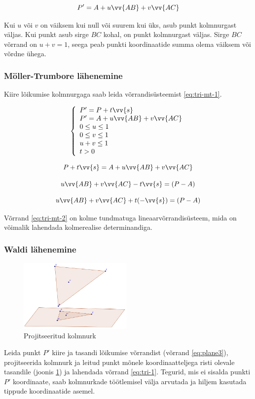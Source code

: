 \documentclass[a4paper,12pt]{report}
\renewcommand{\vec}[1]{\vv{#1}}
\begin{document}
\begin{equation} \label{eq:tri-1}
P' = A + u\vec{AB} + v\vec{AC}
\end{equation}

Kui \(u\) või \(v\) on väiksem kui null või suurem kui üks, asub punkt
kolmnurgast väljas. Kui punkt asub sirge \(BC\) kohal, on punkt
kolmnurgast väljas. Sirge \(BC\) võrrand on \(u + v = 1\), seega peab
punkti koordinaatide summa olema väiksem või võrdne ühega.

\subsubsection{Möller-Trumbore lähenemine}
Kiire lõikumise kolmnurgaga saab leida võrrandisüsteemist \ref{eq:tri-mt-1}.

\begin{equation} \label{eq:tri-mt-1}
\left\{
\begin{array}{l}
P' = P + t\vec s \\
P' = A + u\vec{AB} + v\vec{AC} \\
0 \leq u \leq 1 \\
0 \leq v \leq 1 \\
u + v \leq 1 \\
t > 0 
\end{array}
\right.
\end{equation}

\[P + t\vec s = A + u\vec{AB} + v\vec{AC}\]

\[u\vec{AB} + v\vec{AC} -t\vec s = (P - A)\]

\begin{equation} \label{eq:tri-mt-2}
u\vec{AB} + v\vec{AC} + t(-\vec s) = (P - A)
\end{equation}

Võrrand \ref{eq:tri-mt-2} on kolme tundmatuga lineaarvõrrandisüsteem,
mida on võimalik lahendada kolmerealise determinandiga. \cite{MT97}

\subsubsection{Waldi lähenemine}
\begin{figure}
\includegraphics[width=0.49\textwidth]{tri-wald}
\caption{Projitseeritud kolmnurk}
\label{fig:tri-wald}
\end{figure}
Leida punkt \(P'\) kiire ja tasandi lõikumise võrrandist (võrrand
\ref{eq:plane3}), projitseerida kolmnurk ja leitud punkt mõnele koordinaatteljega
risti olevale tasandile (joonis \ref{fig:tri-wald}) ja lahendada võrrand \ref{eq:tri-1}. Tegurid, mis
ei sisalda punkti \(P'\) koordinaate, saab kolmnurkade töötlemisel välja
arvutada ja hiljem kasutada tippude koordinaatide asemel.
\cite[lk. 91]{wald::PhD}
\end{document}
